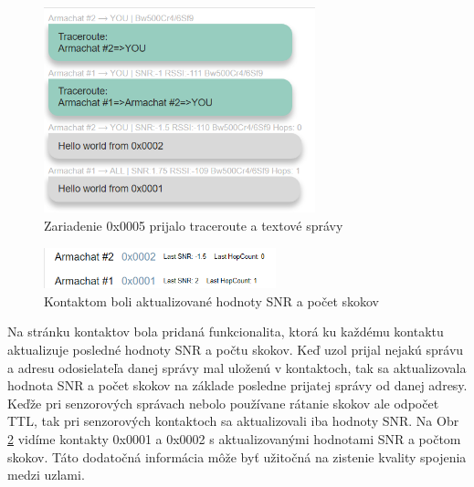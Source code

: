 \documentclass[slovak,master]{diploma}
\begin{document}
\begin{figure}[h!]
  \centering
  \includegraphics[width=0.7\textwidth]{Figures/testingTR.png}
  \caption{Zariadenie 0x0005 prijalo traceroute a textové správy}
  \label{fig:testingTR}
\end{figure}


\begin{figure}[h!]
  \centering
  \includegraphics[width=0.6\textwidth]{Figures/contactsLastSNR.png}
  \caption{Kontaktom boli aktualizované hodnoty SNR a počet skokov}
  \label{fig:contactsLastSNR}
\end{figure}

Na stránku kontaktov bola pridaná funkcionalita, ktorá ku každému kontaktu aktualizuje posledné hodnoty SNR a počtu skokov. 
Keď uzol prijal nejakú správu a adresu odosielateľa danej správy mal uloženú v kontaktoch, tak sa aktualizovala hodnota SNR a počet skokov na 
základe posledne prijatej správy od danej adresy. Keďže pri senzorových správach nebolo používane rátanie skokov ale odpočet TTL, tak pri 
senzorových kontaktoch sa aktualizovali iba hodnoty SNR. Na Obr \ref{fig:contactsLastSNR} vidíme kontakty 0x0001 a 0x0002 s aktualizovanými hodnotami SNR a počtom skokov.
Táto dodatočná informácia môže byť užitočná na zistenie kvality spojenia medzi uzlami.
\end{document}
